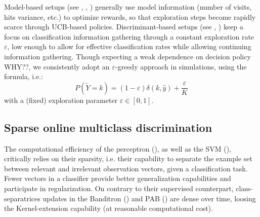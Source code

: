 \documentclass[preprint,12pt,authoryear]{elsarticle}
\begin{document}
Model-based setups (see \cite{lai1985asymptotically}, \cite{auer2003nonstochastic}, \cite{crammer2013multiclass}) generally use model information (number of visits, hits variance, etc.) to optimize rewards, so that exploration steps become rapidly scarce through UCB-based policies. 
Discriminant-based setups (see \cite{kakade2008efficient}, \cite{zhong2015esann}) keep a focus on classification information gathering through  
a constant exploration rate $\varepsilon$, low enough to allow for effective classification rates while allowing continuing information gathering.
{\color{red} Though expecting a weak dependence on decision policy WHY??}, we consistently adopt an $\varepsilon$-greedy approach in simulations, using the \cite{kakade2008efficient} formula, i.e.:
$$P(\tilde{Y}=k) = (1-\varepsilon) \delta(k,\hat{y}) + \frac{\varepsilon}{K}$$ with a (fixed) exploration parameter $\varepsilon \in [0,1]$.


\subsection{Sparse online multiclass discrimination}\label{sec:sparse-online-multiclass-discrimination}

%



The computational efficiency of the perceptron (\cite{rosenblatt1958perceptron}), as well as the SVM (\cite{vapnik1998statistical}),  critically relies on their sparsity, i.e. their capability to separate the example  set between relevant and irrelevant observation vectors, given a classification task. Fewer vectors in a classifier provide better generalization capabilities and participate in regularization.
On contrary to their supervised counterpart, class-separatrices updates in the Banditron (\cite{kakade2008efficient}) and PAB (\cite{zhong2015esann}) are dense over time, loosing the Kernel-extension capability (at reasonable computational cost). 
\end{document}
